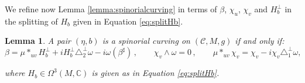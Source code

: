 \documentclass[10pt,a4paper,twoside,reqno]{amsart}
\theoremstyle{plain}
\newtheorem{lemma}[thm]{Lemma}
\theoremstyle{definition}
\theoremstyle{remark}
\def\C{\mathbb{C}}
\def\cC{{\mathcal C}}
\def\cC{\mathcal{C}}
\begin{document}
\noindent
We refine now Lemma \ref{lemma:spinorialcurving} in terms of $\beta$, $\chi_u$, $\chi_v$ and $H_b^{\perp}$ in the splitting of $H_b$ given in Equation \eqref{eq:splitHb}.

\begin{lemma}
\label{lemma:spinorialcurvingII}
A pair $(\eta,b)$ is a spinorial curving on $(\cC,M,g)$ if and only if:
\begin{equation*}
\beta = \mu*_{uv}H_b^\perp + iH_b^\perp\triangle_2^\perp\omega - i\omega(\beta^\sharp)\, , \qquad  \chi_v  \wedge \omega = 0\, , \qquad  \mu \ast_{uv} \chi_v = \chi_v - i \chi_v \triangle^{\perp}_1 \omega,
\end{equation*}

\noindent
where $H_b \in \Omega^3(M ,\C)$ is given as in Equation \eqref{eq:splitHb}.
\end{lemma}
\end{document}
